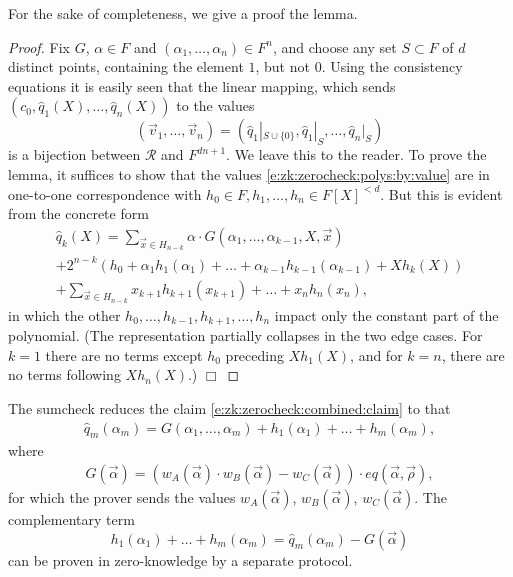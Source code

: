 For the sake of completeness, we give a proof the lemma.
\begin{proof}
Fix $G$, $\alpha\in F$ and $(\alpha_1,\ldots,\alpha_n)\in F^n$, and choose any set $S\subset F$ of $d$ distinct points, containing the element $1$, but not $0$.
Using the consistency equations it is easily seen that the linear mapping, which sends $(c_0,\hat q_1(X),\ldots, \hat q_n(X))$ to the values   
\begin{equation}
\label{e:zk:zerocheck:polys:by:value}
(\vec v_1,\ldots, \vec v_n) = (\hat q_1|_{S\cup\{0\}},\hat q_1|_S, \ldots, \hat q_n|_S) 
\end{equation}
is a bijection between $\mathcal R$ and $F^{dn + 1}$. 
We leave this to the reader.\footnotemark
{}
To prove the lemma, it suffices to show that the values \eqref{e:zk:zerocheck:polys:by:value} are in one-to-one correspondence with $h_0\in F, h_1,\ldots, h_n\in F[X]^{<d}$.
But this is evident from the concrete form
\begin{multline*}
\hat q_{k}(X) = \sum_{\vec x \in H_{n-k}} \alpha \cdot G(\alpha_1,\ldots, \alpha_{k-1}, X,\vec x) 
\\
+ 2^{n-k} (h_0 + \alpha_1 h_1(\alpha_1) +\ldots +\alpha_{k-1} h_{k-1}(\alpha_{k-1})+ X h_{k}(X)) 
\\+ \sum_{\vec x \in H_{n-k}} x_{k+1} h_{k+1}(x_{k+1}) + \ldots + x_n 
h_n(x_n),
\end{multline*}
in which the other $h_0,\ldots, h_{k-1}, h_{k+1},\ldots, h_n$ impact only the constant part of the polynomial.
(The representation partially collapses in the two edge cases.
For $k=1$ there are no terms except $h_0$ preceding $X h_1(X)$, and for $k=n$, there are no terms following $X h_n(X)$.)
$\Box$
\end{proof}


The sumcheck reduces the claim \eqref{e:zk:zerocheck:combined:claim} to that 
\begin{align*}
\hat q_m(\alpha_m) = G(\alpha_1,\ldots, \alpha_m) + h_1(\alpha_1) + \ldots + h_m(\alpha_m),
\end{align*}
where
\begin{align*}
G(\vec\alpha) =  (w_A(\vec\alpha)\cdot w_B(\vec\alpha) - w_C(\vec\alpha))\cdot eq(\vec\alpha,\vec\rho),    
\end{align*}
for which the prover sends the values $w_A(\vec\alpha)$, $w_B(\vec\alpha)$, $w_C(\vec\alpha)$. 
The complementary term 
\begin{equation}
\label{e:zk:zerocheck:mask:opening}
h_1(\alpha_1) + \ldots + h_m(\alpha_m) = \hat q_m(\alpha_m) - G(\vec\alpha)
\end{equation}
can be proven in zero-knowledge by a separate protocol.

